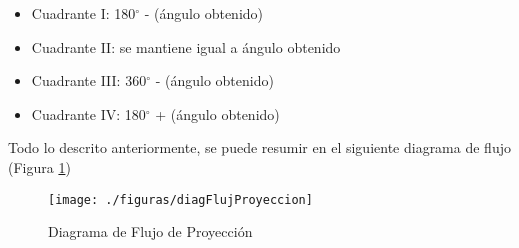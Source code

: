 \documentclass[a4paper,openright,12pt]{report}
\begin{document}
\begin{itemize}
	\item Cuadrante I: 180$^{\circ}$ - (ángulo obtenido)
	\item Cuadrante II: se mantiene igual a ángulo obtenido
	\item Cuadrante III: 360$^{\circ}$ - (ángulo obtenido)
	\item Cuadrante IV: 180$^{\circ}$ + (ángulo obtenido)
\end{itemize}
Todo lo descrito anteriormente, se puede resumir en el siguiente diagrama de flujo (Figura \ref{fig:diagFlujProyeccion})
\begin{figure}[thb]
	\centering
	\texttt{[image: ./figuras/diagFlujProyeccion]}
	\caption{Diagrama de Flujo de Proyección} \label{fig:diagFlujProyeccion}
\end{figure}
\begin{comment}
\begin{algorithm}[tbh]
	\SetAlgoLined
	\KwData{Imagen Depth, Imagen RGB, class Persona	}
	\KwResult{Calcular posición de la persona en imagen Depth}
	Obtener contorno de la class Persona\;
	Calcular centro del contorno usando Momentos\;
	Calcular distancia entre posición anterior y actual\;
	\If{distancia $<$ 5}{
		posición actual = posición anterior
	}
	Guardar posición actual en class Persona\;
	Mostrar imagen RGB con punto central\;
	\caption{Posición de la Persona}
	\label{alg:posicion}
\end{algorithm}
\end{comment}

\begin{comment}
\begin{algorithm}[tbh]
	\SetAlgoLined
	\KwIn{Posición persona (x,y)}
	\KwData{Punto Central $\rightarrow$ (-35.0, 24.0, 0.0)}
	\KwResult{Posicionar cámara virtual respecto a posición de la persona, enfocando a punto central}
	Obtener Posición de la persona\;
	Posición cámara $\rightarrow$ Posición persona $/$ 10\;
	
	\If{Posición cámara $!=$ Posición cámara anterior}{
		Calcular ángulo z entre Posición cámara y Punto Central\;
		Rotar cámara en el ángulo z calculado\;
		Rotar ventana de cámara\;
	}
	Ubicar cámara en la Posición cámara\;
	\caption{proyección de la Persona}
\end{algorithm}
\end{comment}
\end{document}
